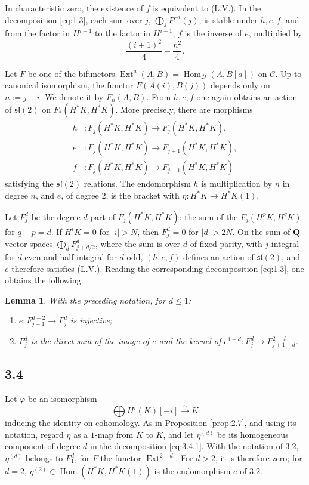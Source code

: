 \documentclass[11pt,a4paper]{article}
\theoremstyle{plain}
\newtheorem{lemma}[theorem]{Lemma}
\theoremstyle{definition}
\theoremstyle{remark}
\DeclareMathOperator{\Ext}{Ext}
\DeclareMathOperator{\Hom}{Hom}
\newcommand{\cD}{\mathscr{D}}
\newcommand{\cC}{\mathscr{C}}
\newcommand{\bQ}{\mathbf{Q}}
\begin{document}
In characteristic zero, the existence of $f$ is equivalent to (L.V.). In the decomposition \eqref{eq:1.3}, each sum over $j$, $\bigoplus_jP^{-i}(j)$, is stable under $h,e,f$, and from the factor in $H^{i+1}$ to the factor in $H^{i-1}$, $f$ is the inverse of $e$, multiplied by
\[
\frac{(i+1)^2}{4}-\frac{n^2}{4}.
\]

Let $F$ be one of the bifunctors $\Ext^a(A,B)=\Hom_{\cD}(A,B[a])$ on $\cC$. Up to canonical isomorphism, the functor $F(A(i),B(j))$ depends only on $n:=j-i$. We denote it by $F_n(A,B)$. From $h,e,f$ one again obtains an action of $\mathfrak{sl}(2)$ on $F_*(H^*K,H^*K)$. More precisely, there are morphisms
\begin{align*}
h&\colon F_j(H^*K,H^*K)\to F_j(H^*K,H^*K),\\
e&\colon F_j(H^*K,H^*K)\to F_{j+1}(H^*K,H^*K),\\
f&\colon F_j(H^*K,H^*K)\to F_{j-1}(H^*K,H^*K)
\end{align*}
satisfying the $\mathfrak{sl}(2)$ relations. The endomorphism $h$ is multiplication by $n$ in degree $n$, and $e$, of degree $2$, is the bracket with $\eta\colon H^*K\to H^*K(1)$.

Let $F_j^d$ be the degree-$d$ part of $F_j(H^*K,H^*K)$: the sum of the $F_j(H^pK,H^qK)$ for $q-p=d$. If $H^iK=0$ for $|i|>N$, then $F_j^d=0$ for $|d|>2N$. On the sum of $\bQ$-vector spaces $\bigoplus_dF_{j+d/2}^d$, where the sum is over $d$ of fixed parity, with $j$ integral for $d$ even and half-integral for $d$ odd, $(h,e,f)$ defines an action of $\mathfrak{sl}(2)$, and $e$ therefore satisfies (L.V.). Reading the corresponding decomposition \eqref{eq:1.3}, one obtains the following.

\begin{lemma}\label{lem:3.3}
With the preceding notation, for $d\leqslant1$:
\begin{enumerate}[label=\textup{(\roman*)}]
\item $e\colon F_{j-1}^{d-2}\to F_j^d$ is injective;
\item $F_j^d$ is the direct sum of the image of $e$ and the kernel of $e^{1-d}\colon F_j^d\to F_{j+1-d}^{2-d}$.
\end{enumerate}
\end{lemma}

\subsection*{3.4}
Let $\varphi$ be an isomorphism
\begin{equation}\label{eq:3.4.1}
\bigoplus H^i(K)[-i]\xrightarrow{\sim}K
\end{equation}
inducing the identity on cohomology. As in Proposition \ref{prop:2.7}, and using its notation, regard $\eta$ as a $1$-map from $K$ to $K$, and let $\eta^{(d)}$ be its homogeneous component of degree $d$ in the decomposition \eqref{eq:3.4.1}. With the notation of 3.2, $\eta^{(d)}$ belongs to $F_1^d$, for $F$ the functor $\Ext^{2-d}$. For $d>2$, it is therefore zero; for $d=2$, $\eta^{(2)}\in\Hom(H^*K,H^*K(1))$ is the endomorphism $e$ of 3.2.
\end{document}
